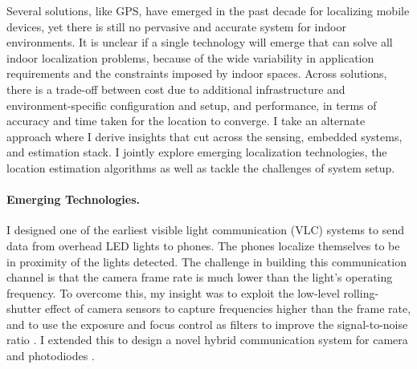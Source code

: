 \documentclass[10pt]{article}
\begin{document}
Several solutions, like GPS, have emerged in the past decade for localizing mobile devices, yet there is still no pervasive and accurate system for indoor environments.  It is unclear if a single technology will emerge that can solve all indoor localization problems, because of the wide variability in application requirements and the constraints imposed by indoor spaces.  Across solutions, there is a trade-off between cost due to additional infrastructure and environment-specific configuration and setup, and performance, in terms of accuracy and time taken for the location to converge. I  take an alternate approach where I derive insights that cut across the sensing, embedded systems, and estimation stack. I jointly explore emerging localization technologies, the location estimation algorithms as well as tackle the challenges of system setup. 


\paragraph{Emerging Technologies. }

I designed one of the earliest visible light communication (VLC) systems to send data from overhead LED lights to phones. The phones localize themselves to be in proximity of the lights detected. The challenge in building this communication channel is that the camera frame rate is much lower than the light's operating frequency. 
To overcome this, my insight was to exploit the low-level rolling-shutter effect of camera sensors to capture frequencies higher than the frame rate, %
 and to use the exposure and focus control as filters to improve the signal-to-noise ratio \cite{rajagopal2014visual, rajagopal2014demonstration}. I extended this to design a novel hybrid communication system for camera and photodiodes \cite{rajagopal2014hybrid}. 
\end{document}
